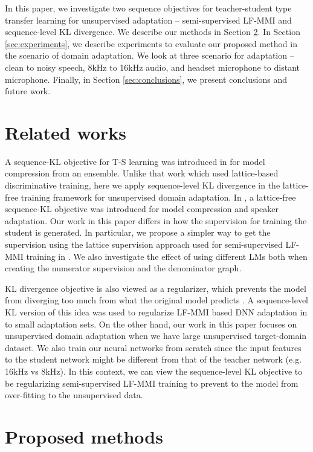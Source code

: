 \documentclass{article}
\begin{document}
In this paper, we investigate two sequence objectives for
teacher-student type transfer learning for unsupervised adaptation --
semi-supervised LF-MMI and sequence-level KL divergence.
We describe our methods in Section \ref{sec:proposed-method}. 
In Section \ref{sec:experiments}, we describe
experiments to evaluate our proposed method in the scenario of domain adaptation.
We look at three scenario for adaptation -- clean to noisy speech, 8kHz to 16kHz
audio, and headset microphone to distant microphone.
Finally, in Section \ref{sec:conclusions}, we present conclusions and future
work.

\section{Related works}

A sequence-KL objective for T-S learning was introduced in
\cite{wong2016sequence-ts} for model compression from an ensemble. 
Unlike that work which used lattice-based discriminative training, here we apply
sequence-level KL divergence in the lattice-free training framework for 
unsupervised domain adaptation. 
In \cite{kanda2017sequence-kl}, a lattice-free
sequence-KL objective was introduced for model compression
and speaker adaptation.
Our work in this paper differs in how the supervision for training the student
is generated. In particular, we propose a simpler way to get the supervision
using the lattice supervision approach used for semi-supervised LF-MMI training 
in \cite{manohar2018semisup}. We also investigate
the effect of using different LMs both when creating the numerator supervision 
and the denominator graph.

KL divergence objective is also viewed as a regularizer, which prevents the
model from diverging too much from what the original model predicts
\cite{yu2013kl}. A sequence-level KL version of this idea was used to regularize
LF-MMI based DNN adaptation in \cite{long2017domain,kanda2017sequence-kl} to
small adaptation sets.
On the other hand, our work in this paper focuses on unsupervised domain
adaptation when we have large unsupervised target-domain dataset. We also train 
our neural networks from scratch since the input features to the student 
network might be different from that of the teacher network (e.g. 16kHz vs
8kHz).
In this context, we can view
the sequence-level KL objective to be regularizing semi-supervised LF-MMI
training to prevent to the model from over-fitting to the unsupervised data.


\section{Proposed methods}
\label{sec:proposed-method}
\end{document}

